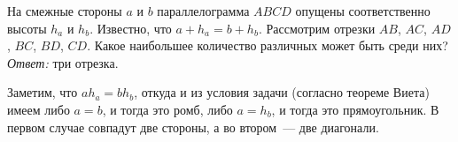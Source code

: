 \problem
На смежные стороны $a$ и $b$ параллелограмма $ABCD$ опущены соответственно
высоты $h_a$ и $h_b$.
Известно, что $a + h_a = b + h_b$.
Рассмотрим отрезки $AB$, $AC$, $AD$, $BC$, $BD$, $CD$.
Какое наибольшее количество различных может быть среди них?
\solution
\label{2011/ru/regatta/junior/geomt/4:solution}%
\emph{Ответ:} три отрезка.
\par
Заметим, что $a h_a = b h_b$, откуда и из условия задачи
(согласно теореме Виета) имеем либо $a = b$, и тогда это ромб, либо $a = h_b$,
и тогда это прямоугольник.
В первом случае совпадут две стороны, а во втором~--- две диагонали.
\endproblem
